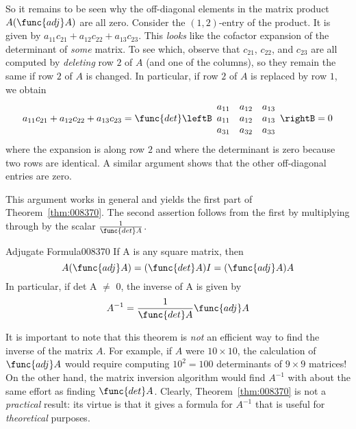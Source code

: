 So it remains to be seen why the off-diagonal elements in the matrix product $A(\func{adj }A)$ are all zero. Consider the $(1, 2)$-entry of the product. It is given by $a_{11}c_{21} + a_{12}c_{22} + a_{13}c_{23}$. This \textit{looks} like the cofactor expansion of the determinant of \textit{some} matrix. To see which, observe that $c_{21}$, $c_{22}$, and $c_{23}$ are all computed by \textit{deleting} row $2$ of $A$ (and one of the columns), so they remain the same if row $2$ of $A$ is changed. In particular, if row $2$ of $A$ is replaced by row $1$, we obtain
\begin{equation*}
a_{11}c_{21}+a_{12}c_{22}+a_{13}c_{23} = \func{det} \leftB \begin{array}{rrr}
a_{11} & a_{12} & a_{13} \\
a_{11} & a_{12} & a_{13} \\
a_{31} & a_{32} & a_{33} 
\end{array}\rightB = 0
\end{equation*}
where the expansion is along row $2$ and where the determinant is zero 
because two rows are identical. A similar argument shows that the other 
off-diagonal entries are zero.


This argument works in general and yields the first part of Theorem~\ref{thm:008370}. The second assertion follows from the first by multiplying through by the scalar $\frac{1}{\func{det } A}$.

\begin{theorem}{Adjugate Formula}{008370}
If A is any square matrix, then
\begin{equation*}
A(\func{adj } A) = (\func{det } A)I = (\func{adj } A)A
\end{equation*}
In particular, if det A $\neq$ 0, the inverse of A is given by
\begin{equation*}
A^{-1} =\frac{1}{\func{det } A}\func{adj } A
\end{equation*}
\end{theorem}

\noindent It is important to note that this theorem is \textit{not} an efficient way to find the inverse of the matrix $A$. For example, if $A$ were $10 \times 10$, the calculation of $\func{adj } A$ would require computing $10^{2} = 100$ determinants of $9 \times 9$ matrices! On the other hand, the matrix inversion algorithm would find $A^{-1}$ with about the same effort as finding $\func{det }A$. Clearly, Theorem~\ref{thm:008370} is not a \textit{practical} result: its virtue is that it gives a formula for $A^{-1}$ that is useful for \textit{theoretical} purposes.


